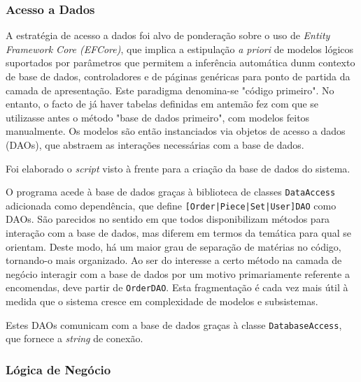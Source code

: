             \subsubsection{Acesso a Dados}
                    A estratégia de acesso a dados foi alvo de ponderação sobre o uso de \textit{Entity Framework Core (EFCore)}, que implica a estipulação \textit{a priori} de modelos lógicos suportados por parâmetros que permitem a inferência automática dunm contexto de base de dados, controladores e de páginas genéricas para ponto de partida da camada de apresentação. Este paradigma denomina-se "código primeiro". No entanto, o facto de já haver tabelas definidas em antemão fez com que se utilizasse antes o método "base de dados primeiro", com modelos feitos manualmente. Os modelos são então instanciados via objetos de acesso a dados (DAOs), que abstraem as interações necessárias com a base de dados.

                    Foi elaborado o \textit{script} visto à frente para a criação da base de dados do sistema.
                    \newpage
                    
                    O programa acede à base de dados graças à biblioteca de classes \texttt{DataAccess} adicionada como dependência, que define \texttt{[Order|Piece|Set|User]DAO} como DAOs. São parecidos no sentido em que todos disponibilizam métodos para interação com a base de dados, mas diferem em termos da temática para qual se orientam. Deste modo, há um maior grau de separação de matérias no código, tornando-o mais organizado. Ao ser do interesse a certo método na camada de negócio interagir com a base de dados por um motivo primariamente referente a encomendas, deve partir de \texttt{OrderDAO}. Esta fragmentação é cada vez mais útil à medida que o sistema cresce em complexidade de modelos e subsistemas.
                
                    Estes DAOs comunicam com a base de dados graças à classe \texttt{DatabaseAccess}, que fornece a \textit{string} de conexão.
            \newpage
            \subsubsection{Lógica de Negócio}
            
